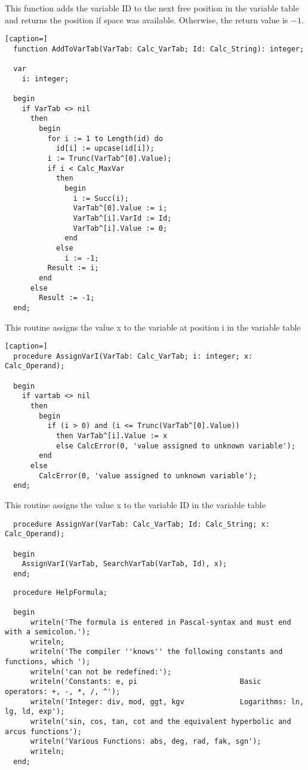 \begin{refsection}
This function adds the variable ID to the next free position in the variable table and returns the position if space was available. Otherwise, the return value is \(-1 \).
\begin{lstlisting}[caption=]
  function AddToVarTab(VarTab: Calc_VarTab; Id: Calc_String): integer;

  var
    i: integer;

  begin
    if VarTab <> nil
      then
        begin
          for i := 1 to Length(id) do
            id[i] := upcase(id[i]);
          i := Trunc(VarTab^[0].Value);
          if i < Calc_MaxVar
            then
              begin
                i := Succ(i);
                VarTab^[0].Value := i;
                VarTab^[i].VarId := Id;
                VarTab^[i].Value := 0;
              end
            else
              i := -1;
          Result := i;
        end
      else
        Result := -1;
  end;
\end{lstlisting}

This routine assigns the value x to the variable at position i in the variable table
\begin{lstlisting}[caption=]
  procedure AssignVarI(VarTab: Calc_VarTab; i: integer; x: Calc_Operand);

  begin
    if vartab <> nil
      then
        begin
          if (i > 0) and (i <= Trunc(VarTab^[0].Value))
            then VarTab^[i].Value := x
            else CalcError(0, 'value assigned to unknown variable');
        end
      else
        CalcError(0, 'value assigned to unknown variable');
  end;
\end{lstlisting}

This routine assigns the value x to the variable ID in the variable table
\begin{lstlisting}
  procedure AssignVar(VarTab: Calc_VarTab; Id: Calc_String; x: Calc_Operand);

  begin
    AssignVarI(VarTab, SearchVarTab(VarTab, Id), x);
  end;
\end{lstlisting}

\begin{lstlisting}
  procedure HelpFormula;

  begin
      writeln('The formula is entered in Pascal-syntax and must end with a semicolon.');
      writeln;
      writeln('The compiler ''knows'' the following constants and functions, which ');
      writeln('can not be redefined:');
      writeln('Constants: e, pi                        Basic operators: +, -, *, /, ^');
      writeln('Integer: div, mod, ggt, kgv             Logarithms: ln, lg, ld, exp');
      writeln('sin, cos, tan, cot and the equivalent hyperbolic and arcus functions');
      writeln('Various Functions: abs, deg, rad, fak, sgn');
      writeln;
  end;
\end{lstlisting}




\end{refsection}
